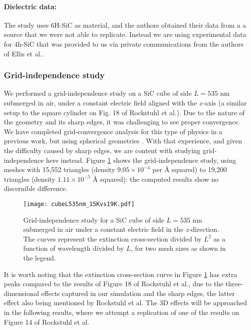 \paragraph{Dielectric data:} The study uses 6H-SiC as material, and the authors obtained their data from a a source that we
were not able to replicate. Instead we are using experimental data for 4h-SiC that was provided to us 
via private communications from the authors of Ellis et al.\cite{ellis2016}.  

\subsubsection{Grid-independence study}\label{sec:independence}

We performed a grid-independence study on a SiC cube of side $L=535$ nm submerged in air, under a 
constant electric field aligned with the $z$-axis (a similar setup to the square cylinder on Fig. 18 of 
Rockstuhl et al.\cite{rockstuhl2005}). 
Due to the nature of the geometry and its sharp edges, it was challenging to see proper convergence. 
We have completed grid-convergence analysis for this type of physics in a previous work, but using spherical geometries \cite{ClementiETal2019}. 
With that experience, and given the difficulty caused by sharp edges, we are content with studying grid-independence here instead.
Figure \ref{fig:cube535} shows the grid-independence study, using meshes with  15,552 triangles (density $9.05\times10^{-4}$ per $\text{\AA}$ squared)
 to 19,200 triangles (density $1.11\times10^{-5}$ $\text{\AA}$ squared):
 the computed results show no discernible difference.

\begin{figure}
    \centering
    \texttt{[image: cubeL535nm\_15Kvs19K.pdf]} 
    \caption{Grid-independence study for a SiC cube of side $L=535$ nm submerged in air under a constant 
    electric field in the $z$-direction. The curves represent the extinction cross-section divided by $L^2$ 
    as a function of wavelength divided by $L$, for two mesh sizes as shown in the legend.}
    \label{fig:cube535}
 \end{figure}

It is worth noting that the extinction cross-section curve in Figure \ref{fig:cube535} has extra peaks 
compared to the results of Figure 18 of Rockstuhl et al., due to the three-dimensional effects captured in our simulation and the sharp 
edges, the latter effect also being mentioned by Rockstuhl et al. The 3D effects will be approached
in the following results, where we attempt a replication of one of the results on Figure 14 of Rockstuhl et al. 


